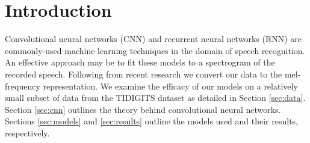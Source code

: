 \section{Introduction}
\label{Introduction}
Convolutional neural networks (CNN) and recurrent neural networks (RNN) are commonly-used machine learning techniques in the domain of speech recognition. An effective approach may be to fit these models to a spectrogram of the recorded speech. Following from recent research \cite{abdel2014convolutional} we convert our data to the mel-frequency representation. We examine the efficacy of our models on a relatively small subset of data from the TIDIGITS dataset as detailed in Section \ref{sec:data}. Section \ref{sec:cnn} outlines the theory behind convolutional neural networks. Sections \ref{sec:models} and \ref{sec:results} outline the models used and their results, respectively.